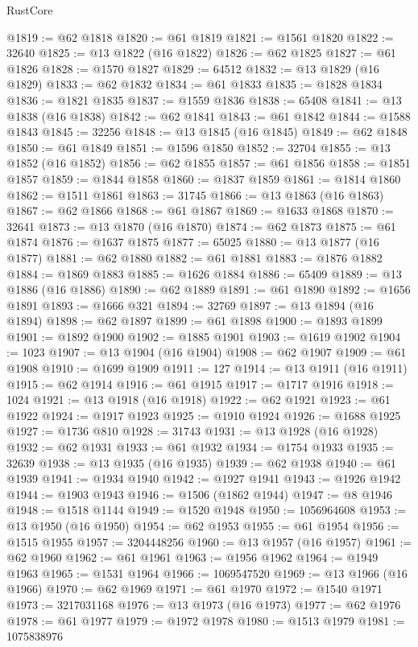 \begin{lexlean}{RustCore}
\begin{coremodule}
@1819 := @62 @1818
@1820 := @61 @1819
@1821 := @1561 @1820
@1822 := 32640
@1825 := @13 @1822 (@16 @1822)
@1826 := @62 @1825
@1827 := @61 @1826
@1828 := @1570 @1827
@1829 := 64512
@1832 := @13 @1829 (@16 @1829)
@1833 := @62 @1832
@1834 := @61 @1833
@1835 := @1828 @1834
@1836 := @1821 @1835
@1837 := @1559 @1836
@1838 := 65408
@1841 := @13 @1838 (@16 @1838)
@1842 := @62 @1841
@1843 := @61 @1842
@1844 := @1588 @1843
@1845 := 32256
@1848 := @13 @1845 (@16 @1845)
@1849 := @62 @1848
@1850 := @61 @1849
@1851 := @1596 @1850
@1852 := 32704
@1855 := @13 @1852 (@16 @1852)
@1856 := @62 @1855
@1857 := @61 @1856
@1858 := @1851 @1857
@1859 := @1844 @1858
@1860 := @1837 @1859
@1861 := @1814 @1860
@1862 := @1511 @1861
@1863 := 31745
@1866 := @13 @1863 (@16 @1863)
@1867 := @62 @1866
@1868 := @61 @1867
@1869 := @1633 @1868
@1870 := 32641
@1873 := @13 @1870 (@16 @1870)
@1874 := @62 @1873
@1875 := @61 @1874
@1876 := @1637 @1875
@1877 := 65025
@1880 := @13 @1877 (@16 @1877)
@1881 := @62 @1880
@1882 := @61 @1881
@1883 := @1876 @1882
@1884 := @1869 @1883
@1885 := @1626 @1884
@1886 := 65409
@1889 := @13 @1886 (@16 @1886)
@1890 := @62 @1889
@1891 := @61 @1890
@1892 := @1656 @1891
@1893 := @1666 @321
@1894 := 32769
@1897 := @13 @1894 (@16 @1894)
@1898 := @62 @1897
@1899 := @61 @1898
@1900 := @1893 @1899
@1901 := @1892 @1900
@1902 := @1885 @1901
@1903 := @1619 @1902
@1904 := 1023
@1907 := @13 @1904 (@16 @1904)
@1908 := @62 @1907
@1909 := @61 @1908
@1910 := @1699 @1909
@1911 := 127
@1914 := @13 @1911 (@16 @1911)
@1915 := @62 @1914
@1916 := @61 @1915
@1917 := @1717 @1916
@1918 := 1024
@1921 := @13 @1918 (@16 @1918)
@1922 := @62 @1921
@1923 := @61 @1922
@1924 := @1917 @1923
@1925 := @1910 @1924
@1926 := @1688 @1925
@1927 := @1736 @810
@1928 := 31743
@1931 := @13 @1928 (@16 @1928)
@1932 := @62 @1931
@1933 := @61 @1932
@1934 := @1754 @1933
@1935 := 32639
@1938 := @13 @1935 (@16 @1935)
@1939 := @62 @1938
@1940 := @61 @1939
@1941 := @1934 @1940
@1942 := @1927 @1941
@1943 := @1926 @1942
@1944 := @1903 @1943
@1946 := @1506 (@1862 @1944)
@1947 := @8 @1946
@1948 := @1518 @1144
@1949 := @1520 @1948
@1950 := 1056964608
@1953 := @13 @1950 (@16 @1950)
@1954 := @62 @1953
@1955 := @61 @1954
@1956 := @1515 @1955
@1957 := 3204448256
@1960 := @13 @1957 (@16 @1957)
@1961 := @62 @1960
@1962 := @61 @1961
@1963 := @1956 @1962
@1964 := @1949 @1963
@1965 := @1531 @1964
@1966 := 1069547520
@1969 := @13 @1966 (@16 @1966)
@1970 := @62 @1969
@1971 := @61 @1970
@1972 := @1540 @1971
@1973 := 3217031168
@1976 := @13 @1973 (@16 @1973)
@1977 := @62 @1976
@1978 := @61 @1977
@1979 := @1972 @1978
@1980 := @1513 @1979
@1981 := 1075838976

\end{coremodule}
\end{lexlean}
